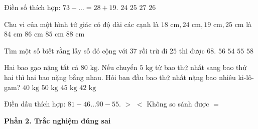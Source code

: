 \begin{ex} %
Điền số thích hợp: $73 - \dots = 28 + 19$.
\choice
{$24$}
{$25$}
{$27$}
{\True $26$}
\end{ex}

\begin{ex} %
Chu vi của một hình tứ giác có độ dài các cạnh là $18\text{ cm}, 24\text{ cm}, 19\text{ cm}, 25\text{ cm}$ là
\choice
{$84\text{ cm}$}
{\True $86\text{ cm}$}
{$85\text{ cm}$}
{$88\text{ cm}$}
\end{ex}

\begin{ex} %
Tìm một số biết rằng lấy số đó cộng với $37$ rồi trừ đi $25$ thì được $68$.
\choice
{\True $56$}
{$54$}
{$55$}
{$58$}
\end{ex}

\begin{ex} %
Hai bao gạo nặng tất cả $80\text{ kg}$. Nếu chuyển $5\text{ kg}$ từ bao thứ nhất sang bao thứ hai thì hai bao nặng bằng nhau. Hỏi ban đầu bao thứ nhất nặng bao nhiêu ki-lô-gam?
\choice
{$40\text{ kg}$}
{$50\text{ kg}$}
{\True $45\text{ kg}$}
{$42\text{ kg}$}
\end{ex}

\begin{ex} %
Điền dấu thích hợp: $81 - 46 \dots 90 - 55$.
\choice
{$>$}
{$<$}
{Không so sánh được}
{\True $=$}
\end{ex}

\textbf{Phần 2. Trắc nghiệm đúng sai}

